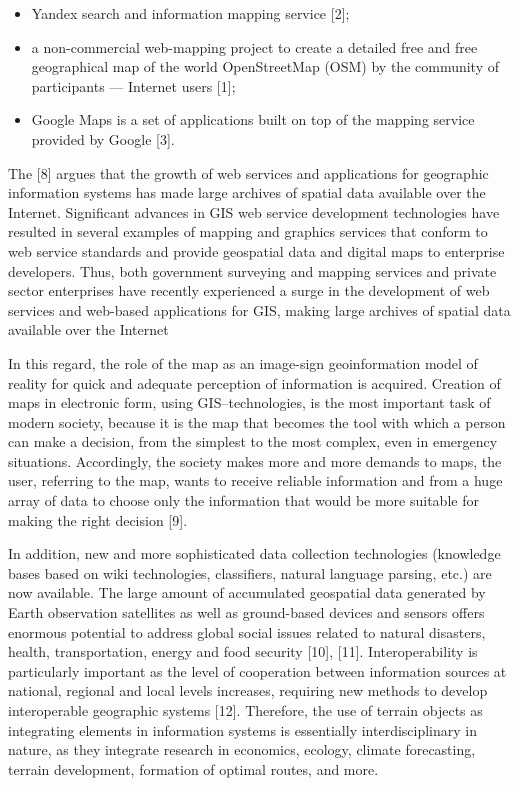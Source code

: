 \documentclass[a4paper]{article}
\begin{document}
\begin{multicols}{2}
{\begin{itemize}[leftmargin=5mm]
        
        \item Yandex search and information mapping service [2];
        \item a non-commercial web-mapping project to create
a detailed free and free geographical map of the
world OpenStreetMap (OSM) by the community of
participants — Internet users [1];
        \item Google Maps is a set of applications built on top of
the mapping service provided by Google [3].
    
\end{itemize}



 The [8] argues that the growth of web services and applications for geographic information systems has made
large archives of spatial data available over the Internet.
Significant advances in GIS web service development
technologies have resulted in several examples of mapping and graphics services that conform to web service
standards and provide geospatial data and digital maps to
enterprise developers. Thus, both government surveying
and mapping services and private sector enterprises have
recently experienced a surge in the development of web
services and web-based applications for GIS, making
large archives of spatial data available over the Internet \par


 In this regard, the role of the map as an image-sign
geoinformation model of reality for quick and adequate
perception of information is acquired. Creation of maps
in electronic form, using GIS–technologies, is the most
important task of modern society, because it is the map
that becomes the tool with which a person can make a
decision, from the simplest to the most complex, even
in emergency situations. Accordingly, the society makes
more and more demands to maps, the user, referring to
the map, wants to receive reliable information and from
a huge array of data to choose only the information that
would be more suitable for making the right decision [9]. \par


 In addition, new and more sophisticated data collection
technologies (knowledge bases based on wiki technologies, classifiers, natural language parsing, etc.) are now
available. The large amount of accumulated geospatial
data generated by Earth observation satellites as well
as ground-based devices and sensors offers enormous
potential to address global social issues related to natural
disasters, health, transportation, energy and food security
[10], [11]. Interoperability is particularly important as
the level of cooperation between information sources
at national, regional and local levels increases, requiring new methods to develop interoperable geographic
systems [12]. Therefore, the use of terrain objects as
integrating elements in information systems is essentially
interdisciplinary in nature, as they integrate research in
economics, ecology, climate forecasting, terrain development, formation of optimal routes, and more.
\par


}
\end{multicols}
\end{document}
